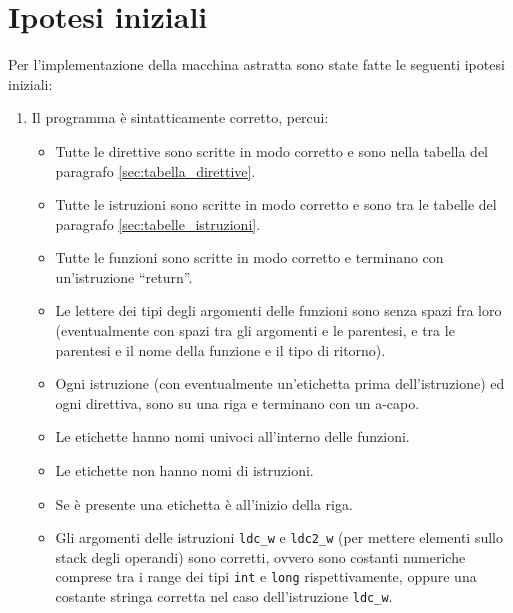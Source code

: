 \section{Ipotesi iniziali}
\label{sec:ipotesi_iniziali}
Per l'implementazione della macchina astratta sono state fatte le seguenti ipotesi iniziali:

\begin{enumerate}
  \item Il programma \`e sintatticamente corretto, percui:
  \begin{itemize}
    \item Tutte le direttive sono scritte in modo corretto e sono nella tabella del paragrafo \ref{sec:tabella_direttive}.
    \item Tutte le istruzioni sono scritte in modo corretto e sono tra le tabelle del paragrafo \ref{sec:tabelle_istruzioni}.
    \item Tutte le funzioni sono scritte in modo corretto e terminano con un'istruzione ``return''.
    \item Le lettere dei tipi degli argomenti delle funzioni sono senza spazi fra loro (eventualmente con spazi tra gli argomenti e le parentesi, e tra le parentesi e il nome della funzione e il tipo di ritorno).
    \item Ogni istruzione (con eventualmente un'etichetta prima dell'istruzione) ed ogni direttiva, sono su una riga e terminano con un a-capo.
    \item Le etichette hanno nomi univoci all'interno delle funzioni.
    \item Le etichette non hanno nomi di istruzioni.
    \item Se \`e presente una etichetta \`e all'inizio della riga.
    \item Gli argomenti delle istruzioni \texttt{ldc\_w} e \texttt{ldc2\_w} (per mettere elementi sullo stack degli operandi) sono corretti, ovvero sono costanti numeriche comprese tra i range dei tipi \texttt{int} e \texttt{long} rispettivamente, oppure una costante stringa corretta nel caso dell'istruzione \texttt{ldc\_w}.
  \end{itemize}


\end{enumerate}
